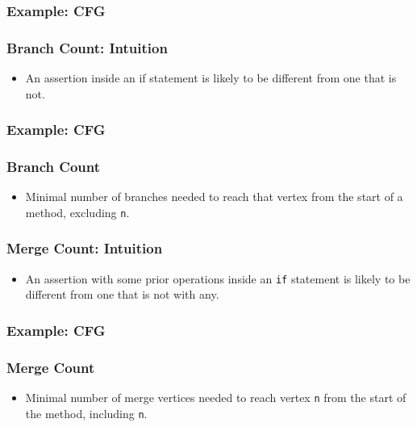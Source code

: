 \documentclass{beamer}
\begin{document}
\begin{frame}
  \frametitle{Example: CFG} 
\begin{center}
\scalebox{0.8}{
     
}
\end{center}
\end{frame}

\begin{frame}
   \frametitle{Branch Count: Intuition} {\Large	
     \begin{itemize}
        \item An assertion inside an if statement is likely to be different from one that is not.
     \end{itemize}
	}
\end{frame}

\begin{frame}
  \frametitle{Example: CFG} {
\begin{center}
\scalebox{0.8}{
     
}
\end{center}
	}
\end{frame}

\begin{frame}
   \frametitle{Branch Count} {\Large	
     \begin{itemize}
        \item Minimal number of branches needed to reach that vertex from the start of a method, excluding {\tt n}.
     \end{itemize}
	}
\end{frame}

\begin{frame}
   \frametitle{Merge Count: Intuition} {\Large	
     \begin{itemize}
        \item An assertion with some prior operations inside an {\tt if} statement is likely to be different from one that is not with any.
     \end{itemize}
	}
\end{frame}

\begin{frame}
  \frametitle{Example: CFG} {
\begin{center}
\scalebox{0.8}{
     
}
\end{center}
	}
\end{frame}

\begin{frame}
   \frametitle{Merge Count} {\Large    
     \begin{itemize}
        \item Minimal number of merge vertices needed to reach vertex {\tt n} from the start of the method, including {\tt n}.
     \end{itemize}
}
 \end{frame}
\end{document}

